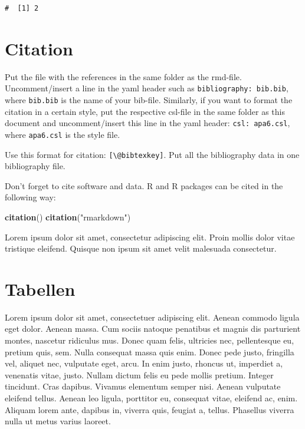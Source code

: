 \documentclass[11pt,a4paper,oneside]{article}
\newenvironment{Shaded}{\begin{snugshade}}{\end{snugshade}}
\newcommand{\KeywordTok}[1]{\textcolor[rgb]{0.13,0.29,0.53}{\textbf{#1}}}
\newcommand{\NormalTok}[1]{#1}
\newcommand{\StringTok}[1]{\textcolor[rgb]{0.31,0.60,0.02}{#1}}
\begin{document}
\begin{verbatim}
#  [1] 2
\end{verbatim}

\hypertarget{citation}{%
\section{Citation}\label{citation}}

Put the file with the references in the same folder as the rmd-file.
Uncomment/insert a line in the yaml header such as
\texttt{bibliography:\ bib.bib}, where \texttt{bib.bib} is the name of
your bib-file. Similarly, if you want to format the citation in a
certain style, put the respective csl-file in the same folder as this
document and uncomment/insert this line in the yaml header:
\texttt{csl:\ apa6.csl}, where \texttt{apa6.csl} is the style file.

Use this format for citation: \texttt{{[}\textbackslash{}@bibtexkey{]}}.
Put all the bibliography data in one bibliography file.

Don't forget to cite software and data. R and R packages can be cited in
the following way:

\begin{Shaded}
\begin{Highlighting}[]
\KeywordTok{citation}\NormalTok{()}
\KeywordTok{citation}\NormalTok{(}\StringTok{"rmarkdown"}\NormalTok{)}
\end{Highlighting}
\end{Shaded}

Lorem ipsum dolor sit amet, consectetur adipiscing elit. Proin mollis
dolor vitae tristique eleifend. Quisque non ipsum sit amet velit
malesuada consectetur.

\hypertarget{tabellen}{%
\section{Tabellen}\label{tabellen}}

Lorem ipsum dolor sit amet, consectetuer adipiscing elit. Aenean commodo
ligula eget dolor. Aenean massa. Cum sociis natoque penatibus et magnis
dis parturient montes, nascetur ridiculus mus. Donec quam felis,
ultricies nec, pellentesque eu, pretium quis, sem. Nulla consequat massa
quis enim. Donec pede justo, fringilla vel, aliquet nec, vulputate eget,
arcu. In enim justo, rhoncus ut, imperdiet a, venenatis vitae, justo.
Nullam dictum felis eu pede mollis pretium. Integer tincidunt. Cras
dapibus. Vivamus elementum semper nisi. Aenean vulputate eleifend
tellus. Aenean leo ligula, porttitor eu, consequat vitae, eleifend ac,
enim. Aliquam lorem ante, dapibus in, viverra quis, feugiat a, tellus.
Phasellus viverra nulla ut metus varius laoreet.
\end{document}
